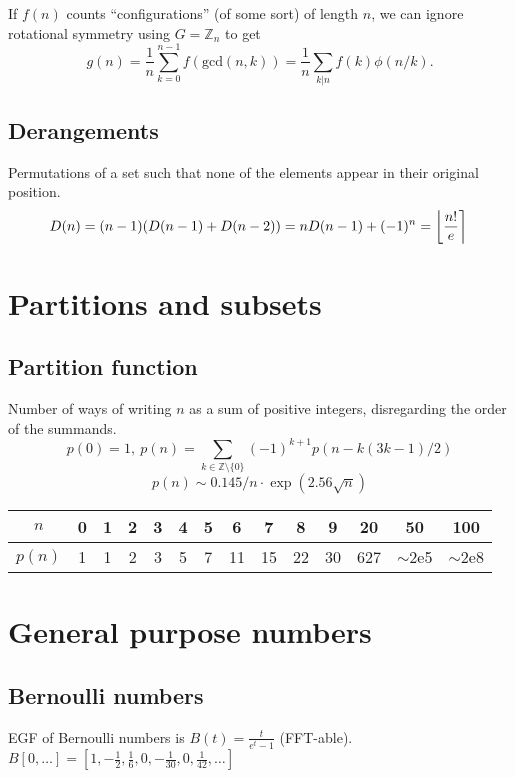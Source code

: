  If $f(n)$ counts ``configurations'' (of some sort) of length $n$, we can ignore rotational symmetry using $G = \mathbb Z_n$ to get
		 \[ g(n) = \frac 1 n \sum_{k=0}^{n-1}{f(\text{gcd}(n, k))} = \frac 1 n \sum_{k|n}{f(k)\phi(n/k)}. \]

\subsection{Derangements}

Permutations of a set such that none of the elements appear in their original position.
\small
\[ \mkern-2mu D(n) = (n-1)(D(n-1)+D(n-2)) = n D(n-1)+(-1)^n = \left\lfloor\frac{n!}{e}\right\rceil \]
\normalsize


\section{Partitions and subsets}

\subsection{Partition function}
	Number of ways of writing $n$ as a sum of positive integers, disregarding the order of the summands.
	\small
	\[ p(0) = 1,\ p(n) = \sum_{k \in \mathbb Z \setminus \{0\}}{(-1)^{k+1} p(n - k(3k-1) / 2)} \]
	\[ p(n) \sim 0.145 / n \cdot \exp(2.56 \sqrt{n}) \]

	\begin{center}
	\begin{tabular}{c|c@{\ }c@{\ }c@{\ }c@{\ }c@{\ }c@{\ }c@{\ }c@{\ }c@{\ }c@{\ }c@{\ }c@{\ }c}
		$n$    & 0 & 1 & 2 & 3 & 4 & 5 & 6  & 7  & 8  & 9  & 20  & 50  & 100 \\ \hline
		$p(n)$ & 1 & 1 & 2 & 3 & 5 & 7 & 11 & 15 & 22 & 30 & 627 & $\mathtt{\sim}$2e5 & $\mathtt{\sim}$2e8 \\
	\end{tabular}
	\end{center}
	\normalsize

\section{General purpose numbers}

\subsection{Bernoulli numbers}
	EGF of Bernoulli numbers is $B(t)=\frac{t}{e^t-1}$ (FFT-able).
	$B[0,\ldots] = [1, -\frac{1}{2}, \frac{1}{6}, 0, -\frac{1}{30}, 0, \frac{1}{42}, \ldots]$

